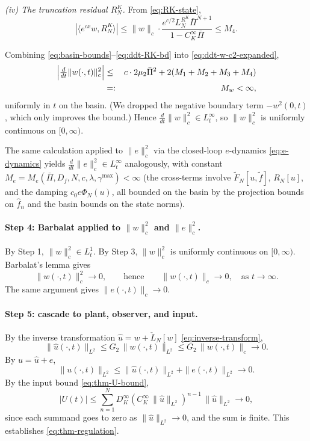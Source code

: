 \documentclass[journal,twoside,web]{ieeecolor}
\begin{document}
\emph{(iv) The truncation residual $R^K_N$.} From \eqref{eq:RK-state},
\begin{equation}\label{eq:ddt-RK-bd}
|\langle e^{cx}w,R^K_N\rangle|\le\|w\|_c\cdot\frac{e^{c/2}L^{R^K}_N\bar\Pi^{N+1}}{1-C_K^\infty\bar\Pi}\le M_4.
\end{equation}

Combining \eqref{eq:basin-bounds}--\eqref{eq:ddt-RK-bd} into \eqref{eq:ddt-w-c2-expanded},
\begin{eqnarray}
\Bigl|\tfrac{d}{dt}\|w(\cdot,t)\|_c^2\Bigr| &\le& c\cdot 2\mu_2\bar\Pi^2+2(M_1+M_2+M_3+M_4) \nonumber\\
&=:& M_w<\infty, \label{eq:ddt-w-Linf}
\end{eqnarray}
uniformly in $t$ on the basin. (We dropped the negative boundary term $-w^2(0,t)$, which only improves the bound.) Hence $\frac{d}{dt}\|w\|_c^2\in L^\infty_t$, so $\|w\|_c^2$ is uniformly continuous on $[0,\infty)$.

The same calculation applied to $\|e\|_c^2$ via the closed-loop $e$-dynamics \eqref{eq:e-dynamics} yields $\frac{d}{dt}\|e\|_c^2\in L^\infty_t$ analogously, with constant $M_e=M_e(\bar\Pi,D_f,N,c,\lambda,\gamma^{\max})<\infty$ (the cross-terms involve $\tilde F_N[u,\tilde f]$, $R_N[u]$, and the damping $c_0 e\Phi_N(u)$, all bounded on the basin by the projection bounds on $\hat f_n$ and the basin bounds on the state norms).

\paragraph{Step 4: Barbalat applied to $\|w\|_c^2$ and $\|e\|_c^2$.}
By Step 1, $\|w\|_c^2\in L^1_t$. By Step 3, $\|w\|_c^2$ is uniformly continuous on $[0,\infty)$. Barbalat's lemma gives
\begin{equation}\label{eq:Barbalat-w}
\|w(\cdot,t)\|_c^2\to 0,\qquad\text{hence}\qquad\|w(\cdot,t)\|_c\to 0,\quad\text{as }t\to\infty.
\end{equation}
The same argument gives $\|e(\cdot,t)\|_c\to 0$.

\paragraph{Step 5: cascade to plant, observer, and input.}
By the inverse transformation $\hat u=w+\check L_N[w]$ \eqref{eq:inverse-transform},
\begin{equation}\label{eq:cascade-uhat}
\|\hat u(\cdot,t)\|_{L^2}\le G_2\,\|w(\cdot,t)\|_{L^2}\le G_2\,\|w(\cdot,t)\|_c\to 0.
\end{equation}
By $u=\hat u+e$,
\begin{equation}\label{eq:cascade-u}
\|u(\cdot,t)\|_{L^2}\le\|\hat u(\cdot,t)\|_{L^2}+\|e(\cdot,t)\|_{L^2}\to 0.
\end{equation}
By the input bound \eqref{eq:thm-U-bound},
\begin{equation}\label{eq:cascade-U}
|U(t)|\le\sum_{n=1}^N D_K^\infty(C_K^\infty\,\|\hat u\|_{L^2})^{n-1}\,\|\hat u\|_{L^2}\to 0,
\end{equation}
since each summand goes to zero as $\|\hat u\|_{L^2}\to 0$, and the sum is finite. This establishes \eqref{eq:thm-regulation}.
\end{document}

